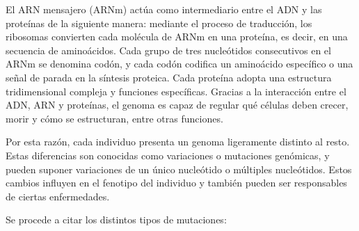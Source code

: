 \documentclass[11pt,spanish,listoffigures,listoftables]{tfgetsinf}
\begin{document}
El ARN mensajero (ARNm) actúa como intermediario entre el \acs{ADN} y las proteínas de la siguiente manera: mediante el proceso de traducción, los ribosomas convierten cada molécula de \acs{ARN}m en una proteína, es decir, en una secuencia de aminoácidos. Cada grupo de tres nucleótidos consecutivos en el ARNm se denomina codón, y cada codón codifica un aminoácido específico o una señal de parada en la síntesis proteica. Cada proteína adopta una estructura tridimensional compleja y funciones específicas. Gracias a la interacción entre el ADN, \acs{ARN} y proteínas, el genoma es capaz de regular qué células deben crecer, morir y cómo se estructuran, entre otras funciones\cite{RIN}. 


Por esta razón, cada individuo presenta un genoma ligeramente distinto al resto. Estas diferencias son conocidas como variaciones o mutaciones genómicas, y pueden suponer variaciones de un único nucleótido o múltiples nucleótidos. Estos cambios influyen en el fenotipo del individuo y también pueden ser responsables de ciertas enfermedades. 

Se procede a citar los distintos tipos de mutaciones:
\end{document}
